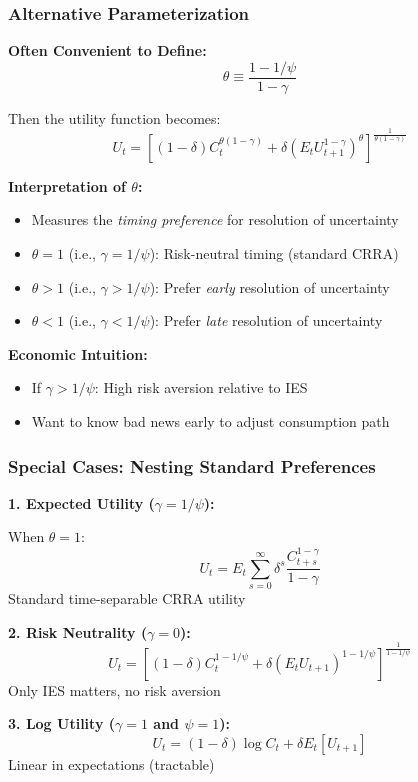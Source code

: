 \documentclass{beamer}
\begin{document}
\begin{frame}
    \frametitle{Alternative Parameterization}
    
    \textbf{Often Convenient to Define:}
    \begin{equation*}
        \theta \equiv \frac{1 - 1/\psi}{1 - \gamma}
    \end{equation*}
    
    
    Then the utility function becomes:
    \begin{equation*}
        U_t = \left[ (1-\delta)C_t^{\theta(1-\gamma)} + \delta \left( E_t U_{t+1}^{1-\gamma} \right)^{\theta} \right]^{\frac{1}{\theta(1-\gamma)}}
    \end{equation*}
    
    
    \textbf{Interpretation of $\theta$:}
    \begin{itemize}
        \item Measures the \textit{timing preference} for resolution of uncertainty
        \item $\theta = 1$ (i.e., $\gamma = 1/\psi$): Risk-neutral timing (standard CRRA)
        \item $\theta > 1$ (i.e., $\gamma > 1/\psi$): Prefer \textit{early} resolution of uncertainty
        \item $\theta < 1$ (i.e., $\gamma < 1/\psi$): Prefer \textit{late} resolution of uncertainty
    \end{itemize}
    
    
    \textbf{Economic Intuition:}
    \begin{itemize}
        \item If $\gamma > 1/\psi$: High risk aversion relative to IES
        \item Want to know bad news early to adjust consumption path
    \end{itemize}
    
\end{frame}

\begin{frame}
    \frametitle{Special Cases: Nesting Standard Preferences}
    
    \textbf{1. Expected Utility ($\gamma = 1/\psi$):}
    
    When $\theta = 1$:
    \begin{equation*}
        U_t = E_t \sum_{s=0}^{\infty} \delta^s \frac{C_{t+s}^{1-\gamma}}{1-\gamma}
    \end{equation*}
    Standard time-separable CRRA utility
    
    
    \textbf{2. Risk Neutrality ($\gamma = 0$):}
    \begin{equation*}
        U_t = \left[ (1-\delta)C_t^{1-1/\psi} + \delta (E_t U_{t+1})^{1-1/\psi} \right]^{\frac{1}{1-1/\psi}}
    \end{equation*}
    Only IES matters, no risk aversion
    
    
    \textbf{3. Log Utility ($\gamma = 1$ and $\psi = 1$):}
    \begin{equation*}
        U_t = (1-\delta) \log C_t + \delta E_t[U_{t+1}]
    \end{equation*}
    Linear in expectations (tractable)
    
\end{frame}
\end{document}
